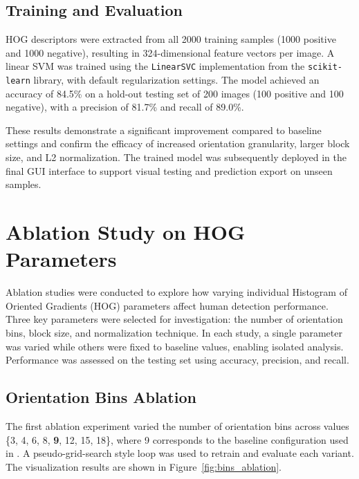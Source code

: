 \documentclass[10pt, onecolumn, a4paper]{article}
\begin{document}
\vspace{-1.5em}
\subsection{Training and Evaluation}
\vspace{-0.5em}
HOG descriptors were extracted from all 2000 training samples (1000 positive and 1000 negative), 
resulting in 324-dimensional feature vectors per image. 
A linear SVM was trained using the \texttt{LinearSVC} implementation from the \texttt{scikit-learn} library, with default regularization settings. 
The model achieved an accuracy of 84.5\% on a hold-out testing set of 200 images (100 positive and 100 negative), 
with a precision of 81.7\% and recall of 89.0\%.

These results demonstrate a significant improvement compared to baseline settings and confirm the efficacy of increased orientation granularity, 
larger block size, and L2 normalization. 
The trained model was subsequently deployed in the final GUI interface to support visual testing and prediction export on unseen samples.

\vspace{0.5em}
\section{Ablation Study on HOG Parameters}
\vspace{0.5em}
Ablation studies were conducted to explore how varying individual Histogram of Oriented Gradients (HOG) parameters affect human detection performance. 
Three key parameters were selected for investigation: the number of orientation bins, block size, and normalization technique. 
In each study, a single parameter was varied while others were fixed to baseline values, enabling isolated analysis. 
Performance was assessed on the testing set using accuracy, precision, and recall.

\subsection{Orientation Bins Ablation}
\vspace{-0.5em}
The first ablation experiment varied the number of orientation bins across values \{3, 4, 6, 8, \textbf{9}, 12, 15, 18\}, 
where 9 corresponds to the baseline configuration used in \cite{1467360}. 
A pseudo-grid-search style loop was used to retrain and evaluate each variant. The visualization results are shown in Figure~\ref{fig:bins_ablation}.
\end{document}
